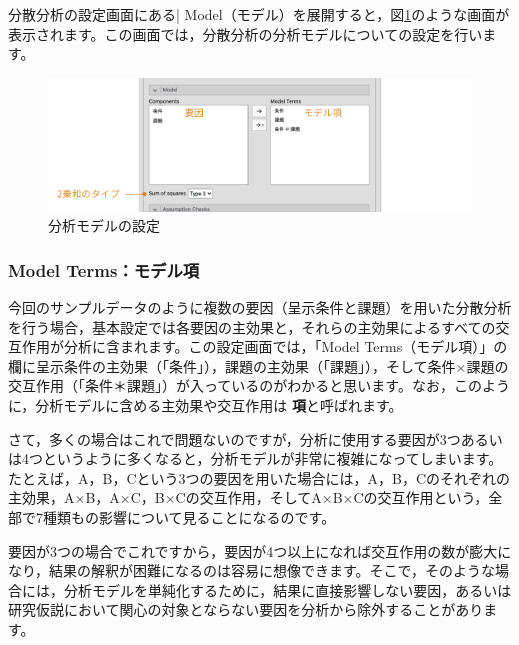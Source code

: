 \documentclass[
  12pt,
  a5jpaper,
  lualatex, ja=standard]{bxjsbook}
\renewcommand{\emph}[1]{\textbf{\color{emph} #1}}
\begin{document}
分散分析の設定画面にある\colorbox{bar}{\textcolor{gmoji2}{| Model}}（モデル）を展開すると，図\ref{fig:ANOVA-anova-model}のような画面が表示されます。この画面では，分散分析の分析モデルについての設定を行います。

\begin{figure}[!ht]

{\centering \includegraphics[width=1\linewidth]{images/ANOVA/anova-model} 

}

\caption{分析モデルの設定}\label{fig:ANOVA-anova-model}
\end{figure}

\hypertarget{model-termsux30e2ux30c7ux30ebux9805}{%
\subsubsection*{Model Terms：モデル項}\label{model-termsux30e2ux30c7ux30ebux9805}}

今回のサンプルデータのように複数の要因（呈示条件と課題）を用いた分散分析を行う場合，基本設定では各要因の主効果と，それらの主効果によるすべての交互作用が分析に含まれます。この設定画面では，「Model Terms（モデル項）」の欄に呈示条件の主効果（「条件」），課題の主効果（「課題」），そして条件×課題の交互作用（「条件＊課題」）が入っているのがわかると思います。なお，このように，分析モデルに含める主効果や交互作用は\emph{項}と呼ばれます。

さて，多くの場合はこれで問題ないのですが，分析に使用する要因が3つあるいは4つというように多くなると，分析モデルが非常に複雑になってしまいます。たとえば，A，B，Cという3つの要因を用いた場合には，A，B，Cのそれぞれの主効果，A×B，A×C，B×Cの交互作用，そしてA×B×Cの交互作用という，全部で7種類もの影響について見ることになるのです。

要因が3つの場合でこれですから，要因が4つ以上になれば交互作用の数が膨大になり，結果の解釈が困難になるのは容易に想像できます。そこで，そのような場合には，分析モデルを単純化するために，結果に直接影響しない要因，あるいは研究仮説において関心の対象とならない要因を分析から除外することがあります。
\end{document}
